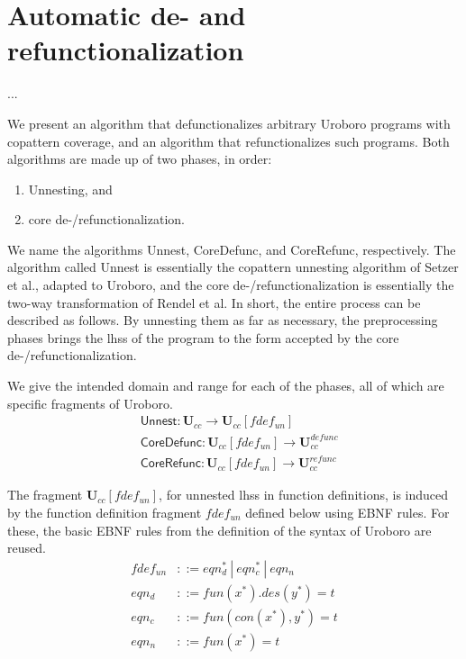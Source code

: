 \chapter{Automatic de- and refunctionalization}


...

We present an algorithm that defunctionalizes arbitrary Uroboro programs with copattern coverage, and an algorithm that refunctionalizes such programs. Both algorithms are made up of two phases, in order:
\begin{enumerate}
\item Unnesting, and
\item core de-/refunctionalization.
\end{enumerate}
We name the algorithms \textsf{Unnest}, \textsf{CoreDefunc}, and \textsf{CoreRefunc}, respectively. The algorithm called \textsf{Unnest} is essentially the copattern unnesting algorithm of Setzer et al., adapted to Uroboro, and the core de-/refunctionalization is essentially the two-way transformation of Rendel et al. In short, the entire process can be described as follows. By unnesting them as far as necessary, the preprocessing phases brings the lhss of the program to the form accepted by the core de-/refunctionalization.

We give the intended domain and range for each of the phases, all of which are specific fragments of Uroboro.
\begin{align*}
& \textsf{Unnest}: \mathbf{U}_{cc} \to \mathbf{U}_{cc}[fdef_{un}] \\
& \textsf{CoreDefunc}: \mathbf{U}_{cc}[fdef_{un}] \to \mathbf{U}^{defunc}_{cc} \\
& \textsf{CoreRefunc}: \mathbf{U}_{cc}[fdef_{un}] \to \mathbf{U}^{refunc}_{cc}
\end{align*}

\begin{definition}
The fragment $\mathbf{U}_{cc}[fdef_{un}]$, for unnested lhss in function definitions, is induced by the function definition fragment $fdef_{un}$ defined below using EBNF rules. For these, the basic EBNF rules from the definition of the syntax of Uroboro are reused.
\begin{align*}
fdef_{un} &::= eqn_d^* ~ | ~ eqn_c^* ~ | ~ eqn_n \\
eqn_d &::= fun(x^*).des(y^*) = t \\
eqn_c &::= fun(con(x^*), y^*) = t \\
eqn_n &::= fun(x^*) = t
\end{align*}
\end{definition}

